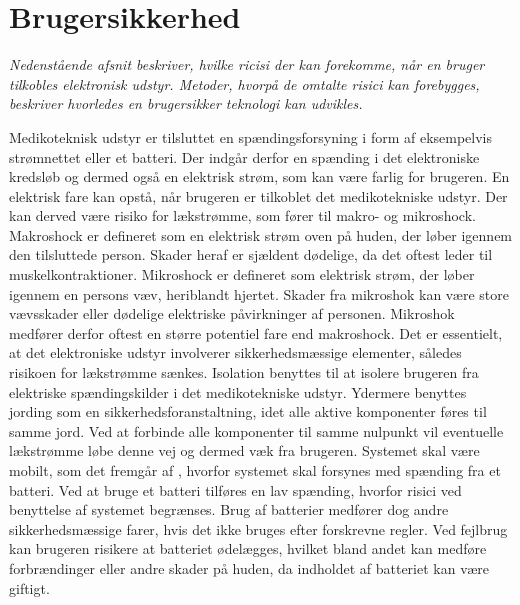 \section{Brugersikkerhed}
\textit{Nedenstående afsnit beskriver, hvilke ricisi der kan forekomme, når en bruger tilkobles elektronisk udstyr. Metoder, hvorpå de omtalte risici kan forebygges, beskriver hvorledes en brugersikker teknologi kan udvikles.}

Medikoteknisk udstyr er tilsluttet en spændingsforsyning i form af eksempelvis strømnettet eller et batteri. Der indgår derfor en spænding i det elektroniske kredsløb og dermed også en elektrisk strøm, som kan være farlig for brugeren. En elektrisk fare kan opstå, når brugeren er tilkoblet det medikotekniske udstyr. Der kan derved være risiko for lækstrømme, som fører til makro- og mikroshock. Makroshock er defineret som en elektrisk strøm oven på huden, der løber igennem den tilsluttede person. Skader heraf er sjældent dødelige, da det oftest leder til muskelkontraktioner. Mikroshock er defineret som elektrisk strøm, der løber igennem en persons væv, heriblandt hjertet. Skader fra mikroshok kan være store vævsskader eller dødelige elektriske påvirkninger af personen. Mikroshok medfører derfor oftest en større potentiel fare end makroshock. \citep{Webster2011} \newline
Det er essentielt, at det elektroniske udstyr involverer sikkerhedsmæssige elementer, således risikoen for lækstrømme sænkes. Isolation benyttes til at isolere brugeren fra elektriske spændingskilder i det medikotekniske udstyr. Ydermere benyttes jording som en sikkerhedsforanstaltning, idet alle aktive komponenter føres til samme jord. Ved at forbinde alle komponenter til samme nulpunkt vil eventuelle lækstrømme løbe denne vej og dermed væk fra brugeren. \citep{Webster2011} \newline 
Systemet skal være mobilt, som det fremgår af , hvorfor systemet skal forsynes med spænding fra et batteri. Ved at bruge et batteri tilføres en lav spænding, hvorfor risici ved benyttelse af systemet begrænses. Brug af batterier medfører dog andre sikkerhedsmæssige farer, hvis det ikke bruges efter forskrevne regler. Ved fejlbrug kan brugeren risikere at batteriet ødelægges, hvilket bland andet kan medføre forbrændinger eller andre skader på huden, da indholdet af batteriet kan være giftigt. 
%
